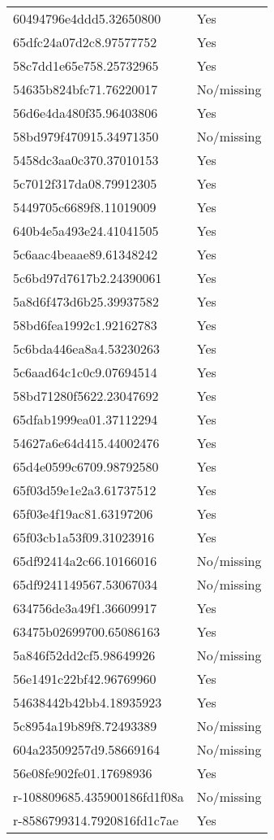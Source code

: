\begin{tabular}{ll}
60494796e4ddd5.32650800 & Yes \\
65dfc24a07d2c8.97577752 & Yes \\
58c7dd1e65e758.25732965 & Yes \\
54635b824bfc71.76220017 & No/missing \\
56d6e4da480f35.96403806 & Yes \\
58bd979f470915.34971350 & No/missing \\
5458dc3aa0c370.37010153 & Yes \\
5c7012f317da08.79912305 & Yes \\
5449705c6689f8.11019009 & Yes \\
640b4e5a493e24.41041505 & Yes \\
5c6aac4beaae89.61348242 & Yes \\
5c6bd97d7617b2.24390061 & Yes \\
5a8d6f473d6b25.39937582 & Yes \\
58bd6fea1992c1.92162783 & Yes \\
5c6bda446ea8a4.53230263 & Yes \\
5c6aad64c1c0c9.07694514 & Yes \\
58bd71280f5622.23047692 & Yes \\
65dfab1999ea01.37112294 & Yes \\
54627a6e64d415.44002476 & Yes \\
65d4e0599c6709.98792580 & Yes \\
65f03d59e1e2a3.61737512 & Yes \\
65f03e4f19ac81.63197206 & Yes \\
65f03cb1a53f09.31023916 & Yes \\
65df92414a2c66.10166016 & No/missing \\
65df9241149567.53067034 & No/missing \\
634756de3a49f1.36609917 & Yes \\
63475b02699700.65086163 & Yes \\
5a846f52dd2cf5.98649926 & No/missing \\
56e1491c22bf42.96769960 & Yes \\
54638442b42bb4.18935923 & Yes \\
5c8954a19b89f8.72493389 & No/missing \\
604a23509257d9.58669164 & No/missing \\
56e08fe902fe01.17698936 & Yes \\
r-108809685.435900186fd1f08a & No/missing \\
r-8586799314.7920816fd1c7ae & Yes \\

\end{tabular}
